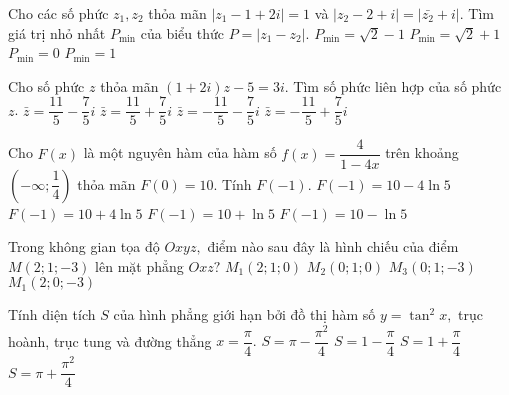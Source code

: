 \begin{ex}%
Cho các số phức $z_1, z_2$ thỏa mãn $|z_1-1+2i|=1$ và $|z_2-2+i|=|\bar{z_2}+i|.$ Tìm giá trị nhỏ nhất $P_{\min}$ của biểu thức $P=|z_1-z_2|.$
\choice
{\True $P_{\min}=\sqrt2-1$}
{$P_{\min}=\sqrt2+1$}
{$P_{\min}=0$}
{$P_{\min}=1$}
\end{ex}

\begin{ex}%
Cho số phức $z$ thỏa mãn $(1+2i)z-5=3i.$ Tìm số phức liên hợp của số phức $z$.
\choice
{$\bar z =\dfrac{11}5-\dfrac75i$}
{\True $\bar z =\dfrac{11}5+\dfrac75i$}
{$\bar z =-\dfrac{11}5-\dfrac75i$}
{$\bar z =-\dfrac{11}5+\dfrac75i$}
\end{ex}

\begin{ex}%
Cho $F(x)$ là một nguyên hàm của hàm số $f(x)=\dfrac4{1-4x}$ trên khoảng $\left(-\infty; \dfrac14\right)$ thỏa mãn $F(0)=10.$ Tính $F(-1)$.
\choice
{$F(-1)=10-4\ln5$}
{$F(-1)=10+4\ln5$}
{$F(-1)=10+\ln5$}
{\True $F(-1)=10-\ln5$}
\end{ex}

\begin{ex}%
Trong không gian tọa độ $Oxyz,$ điểm nào sau đây là hình chiếu của điểm $M(2;1;-3)$ lên mặt phẳng $Oxz?$
\choice
{$M_1(2;1;0)$}
{$M_2(0;1;0)$}
{$M_3(0;1;-3)$}
{\True $M_1(2;0;-3)$}
\end{ex}

\begin{ex}%
Tính diện tích $S$ của hình phẳng giới hạn bởi đồ thị hàm số $y=\tan^2x,$ trục hoành, trục tung và đường thẳng $x=\dfrac\pi4.$
\choice
{$S=\pi-\dfrac{\pi^2}4$}
{\True $S=1-\dfrac{\pi}4$}
{$S=1+\dfrac{\pi}4$}
{$S=\pi+\dfrac{\pi^2}4$}
\end{ex}

